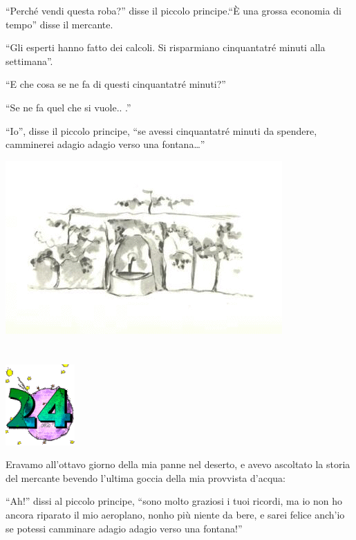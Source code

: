 \documentclass[11pt]{scrbook}
\begin{document}
``Perché vendi questa roba?'' disse il piccolo principe.``È una grossa
economia di tempo'' disse il mercante.

``Gli esperti hanno fatto dei calcoli. Si risparmiano cinquantatré
minuti alla settimana''.

``E che cosa se ne fa di questi cinquantatré minuti?''

``Se ne fa quel che si vuole.. .''

``Io'', disse il piccolo principe, ``se avessi cinquantatré minuti da
spendere, camminerei adagio adagio verso una fontana\ldots{}''

\begin{center}
\includegraphics{./img/studanka.png}
\end{center}

\chapter{}
\begin{center}
\includegraphics{./img/chapter24.png}
\end{center}

Eravamo all'ottavo giorno della mia panne nel deserto, e avevo ascoltato
la storia del mercante bevendo l'ultima goccia della mia provvista
d'acqua:

``Ah!'' dissi al piccolo principe, ``sono molto graziosi i tuoi ricordi,
ma io non ho ancora riparato il mio aeroplano, nonho più niente da bere,
e sarei felice anch'io se potessi camminare adagio adagio verso una
fontana!''
\end{document}
